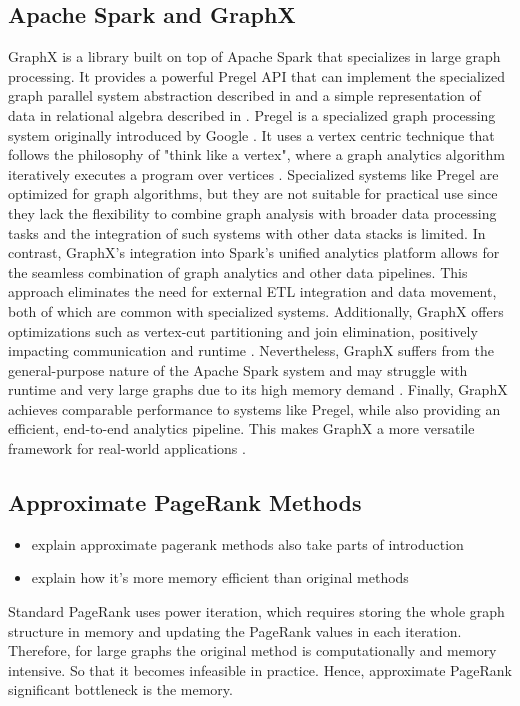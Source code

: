 \subsection{Apache Spark and GraphX}


GraphX is a library built on top of Apache Spark that specializes in large graph processing. It provides a powerful Pregel API that can implement the specialized graph parallel system abstraction described in\cite{malewicz_pregel_2010} and a simple representation of data in relational algebra described in \cite{xin_graphx_2014}. Pregel is a specialized graph processing system originally introduced by Google \cite{malewicz_pregel_2010}. It uses a vertex centric technique that follows the philosophy of "think like a vertex", where a graph analytics algorithm iteratively executes a program over vertices \cite{xin_graphx_2014}. 
Specialized systems like Pregel are optimized for graph algorithms, but they are not suitable for practical use since they lack the flexibility to combine graph analysis with broader data processing tasks and the integration of such systems with other data stacks is limited. In contrast, GraphX's integration into Spark's unified analytics platform allows for the seamless combination of graph analytics and other data pipelines. This approach eliminates the need for external ETL integration and data movement, both of which are common with specialized systems. Additionally, GraphX offers optimizations such as vertex-cut partitioning and join elimination, positively impacting communication and runtime \cite{xin_graphx_2014}. Nevertheless, GraphX suffers from the general-purpose nature of the Apache Spark system and may struggle with runtime and very large graphs due to its high memory demand \cite{zhuo_distributed_2021}.  
Finally, GraphX achieves comparable performance to systems like Pregel, while also providing an efficient, end-to-end analytics pipeline. This makes GraphX a more versatile framework for real-world applications \cite{xin_graphx_2014}.


\subsection{Approximate PageRank Methods}
\begin{itemize}
    \item explain approximate pagerank methods also take parts of introduction
    \item explain how it's more memory efficient than original methods
\end{itemize}

Standard PageRank uses power iteration, which requires storing the whole graph structure in memory and updating the PageRank values in each iteration. Therefore, for large graphs the original method is computationally and memory intensive. So that it becomes infeasible in practice. Hence, approximate PageRank 
significant bottleneck is the memory. 